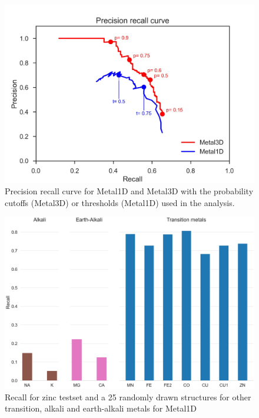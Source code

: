 \documentclass[ lineno,
  9pt]{elife}
\newenvironment{fignos:tagged-figure}[1][]{
  \let\oldthefigure\thefigure
  \let\oldtheHfigure\theHfigure
  \renewcommand{\thefigure}{#1}
  \renewcommand{\theHfigure}{#1}
}{
  \let\thefigure\oldthefigure
  \let\theHfigure\oldtheHfigure
  \addtocounter{figure}{-1}
}
\begin{document}
\begin{fignos:tagged-figure}[S2]

\begin{figure}
\hypertarget{fig:precisionrecall}{%
\centering
\includegraphics{images/precisionrecall_0.5.jpg}
\caption{Precision recall curve for Metal1D and Metal3D with the probability cutoffs (Metal3D) or thresholds (Metal1D) used in the analysis.}\label{fig:precisionrecall}
}
\end{figure}

\end{fignos:tagged-figure}




\begin{fignos:tagged-figure}[S3]

\begin{figure}
\hypertarget{fig:selectivity-metal1d}{%
\centering
\includegraphics{images/metal1D_metal_selectivity.jpg}
\caption{Recall for zinc testset and a 25 randomly drawn structures for other transition, alkali and earth-alkali metals for Metal1D}\label{fig:selectivity-metal1d}
}
\end{figure}

\end{fignos:tagged-figure}
\end{document}
